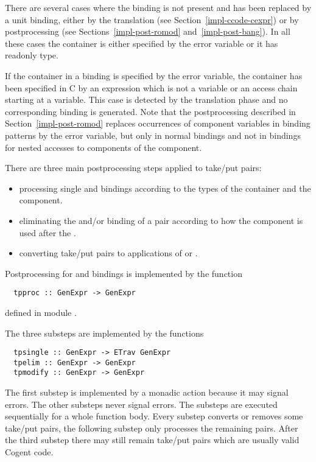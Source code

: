 There are several cases where the  binding is not present and has been replaced by a unit binding, either by the
translation (see Section~\ref{impl-ccode-cexpr}) or by postprocessing (see Sections~\ref{impl-post-romod} and~\ref{impl-post-bang}).
In all these cases the container is either specified by the error variable  or it has readonly type.

If the container in a  binding is specified by the error variable, the container has been specified in C by an expression
which is not a variable or an access chain starting at a variable. This case is detected by the translation phase and no corresponding
 binding is generated. Note that the postprocessing described in Section~\ref{impl-post-romod} replaces occurrences of
component variables in binding patterns by the error variable, but only in normal bindings and not in  bindings for nested
accesses to components of the component.

There are three main postprocessing steps applied to take/put pairs:
\begin{itemize}
\item processing single  and  bindings according to the types of the container and the component.
\item eliminating the  and/or  binding of a pair according to how the component is used after the .
\item converting take/put pairs to applications of  or .
\end{itemize}

Postprocessing for  and  bindings is implemented by the function
\begin{verbatim}
  tpproc :: GenExpr -> GenExpr
\end{verbatim}
defined in module .

The three substeps are implemented by the functions
\begin{verbatim}
  tpsingle :: GenExpr -> ETrav GenExpr
  tpelim :: GenExpr -> GenExpr
  tpmodify :: GenExpr -> GenExpr
\end{verbatim}
The first substep is implemented by a monadic action because it may signal errors. The other substeps never signal errors.
The substeps are executed sequentially for a whole function body. Every substep converts or removes some take/put pairs, the following
substep only processes the remaining pairs. After the third substep there may still remain take/put pairs which are usually valid
Cogent code.

